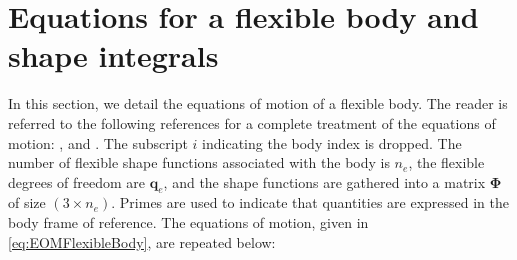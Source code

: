 \documentclass[wes, manuscript]{copernicus}
\renewcommand{\v}[1]{\boldsymbol{#1}}
\newcommand{\m}[1]{\boldsymbol{#1}}
\begin{document}




\appendix


\section{Equations for a flexible body and shape integrals}
\label{sec:FlexibleDefinitions}
In this section, we detail the equations of motion of a flexible body. 
The reader is referred to the following references for a complete treatment of the equations of motion: \cite{shabana:book}, \cite{Schwertassek:book} and \cite{Wallrapp:1994}.
% 
% 
% 
The subscript $i$ indicating the body index is dropped.
The number of flexible shape functions associated with the body is $n_e$, the flexible degrees of freedom are $\v{q}_e$, and the shape functions are gathered into a matrix $\m{\Phi}$ of size $(3\times n_e)$.
Primes are used to indicate that quantities are expressed in the body frame of reference.
The equations of motion, given in \autoref{eq:EOMFlexibleBody}, are repeated below:
\end{document}
